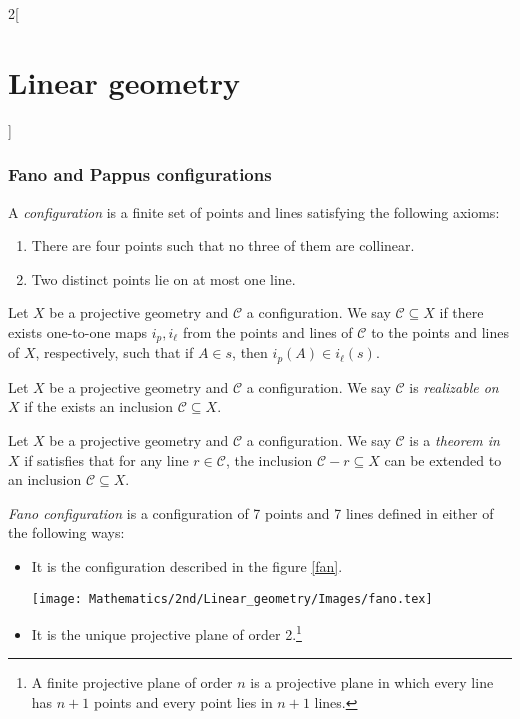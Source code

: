 \documentclass[class=article,10pt,crop=false]{standalone}
\begin{document}
\begin{multicols}{2}[\section{Linear geometry}]
\subsubsection*{Fano and Pappus configurations}
\begin{definition}
A \textit{configuration} is a finite set of points and lines satisfying the following axioms:
\begin{enumerate}
    \item There are four points such that no three of them are collinear.
    \item Two distinct points lie on at most one line.
\end{enumerate}
\end{definition}
\begin{definition}
Let $X$ be a projective geometry and $\mathcal{C}$ a configuration. We say $\mathcal{C}\subseteq X$ if there exists one-to-one maps $i_p,i_\ell$ from the points and lines of $\mathcal{C}$ to the points and lines of $X$, respectively, such that if $A\in s$, then $i_p(A)\in i_\ell(s)$.
\end{definition}
\begin{definition}
Let $X$ be a projective geometry and $\mathcal{C}$ a configuration. We say $\mathcal{C}$ is \textit{realizable on $X$} if the exists an inclusion $\mathcal{C}\subseteq X$.
\end{definition}
\begin{definition}
Let $X$ be a projective geometry and $\mathcal{C}$ a configuration. We say $\mathcal{C}$ is a \textit{theorem in $X$} if satisfies that for any line $r\in\mathcal{C}$, the inclusion $\mathcal{C}-r\subseteq X$ can be extended to an inclusion $\mathcal{C}\subseteq X$.
\end{definition}
\begin{definition}
\textit{Fano configuration} is a configuration of 7 points and 7 lines defined in either of the following ways:
\begin{itemize}
    \item It is the configuration described in the figure \ref{fan}.\par
    \begin{minipage}{\linewidth}
        \centering
        \texttt{[image: Mathematics/2nd/Linear\_geometry/Images/fano.tex]} 
        \label{fan}
    \end{minipage}
    \item It is the unique projective plane of order 2.\footnote{A finite projective plane of order $n$ is a  projective plane in which every line has $n+1$ points and every point lies in $n+1$ lines.}

\end{itemize}
\end{definition}
\end{multicols}
\end{document}
